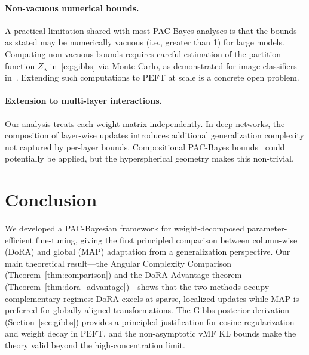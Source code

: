 \documentclass[11pt]{article}
\begin{document}
\paragraph{Non-vacuous numerical bounds.}
A practical limitation shared with most PAC-Bayes analyses is that the
bounds as stated may be numerically vacuous (i.e., greater than 1) for
large models.
Computing non-vacuous bounds requires careful estimation of the partition
function $Z_\lambda$ in~\eqref{eq:gibbs} via Monte Carlo, as demonstrated
for image classifiers in~\cite{dziugaite2017computing}.
Extending such computations to PEFT at scale is a concrete open problem.

\paragraph{Extension to multi-layer interactions.}
Our analysis treats each weight matrix independently.
In deep networks, the composition of layer-wise updates introduces
additional generalization complexity not captured by per-layer bounds.
Compositional PAC-Bayes bounds~\cite{dziugaite2017computing} could
potentially be applied, but the hyperspherical geometry makes this
non-trivial.

\section{Conclusion}
\label{sec:conclusion}

We developed a PAC-Bayesian framework for weight-decomposed parameter-efficient
fine-tuning, giving the first principled comparison between column-wise
(DoRA) and global (MAP) adaptation from a generalization perspective.
Our main theoretical result---the Angular Complexity Comparison
(Theorem~\ref{thm:comparison}) and the DoRA Advantage theorem
(Theorem~\ref{thm:dora_advantage})---shows that the two methods occupy
complementary regimes: DoRA excels at sparse, localized updates while
MAP is preferred for globally aligned transformations.
The Gibbs posterior derivation (Section~\ref{sec:gibbs}) provides a
principled justification for cosine regularization and weight decay in
PEFT, and the non-asymptotic vMF KL bounds make the theory valid beyond
the high-concentration limit.

\end{document}
